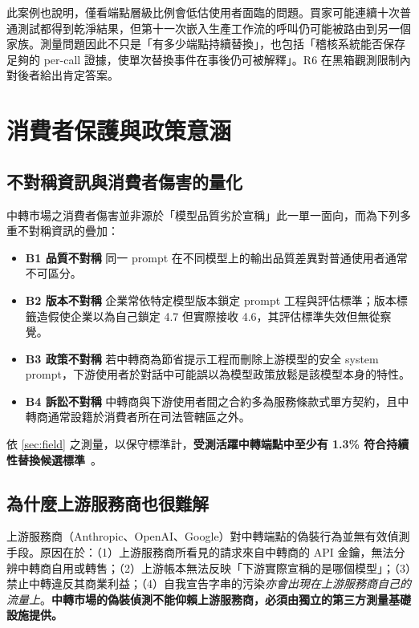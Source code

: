 \documentclass[UTF8,fontset=none,10pt,a4paper,twocolumn]{ctexart}
\begin{document}
此案例也說明，僅看端點層級比例會低估使用者面臨的問題。買家可能連續十次普通測試都得到乾淨結果，但第十一次嵌入生產工作流的呼叫仍可能被路由到另一個家族。測量問題因此不只是「有多少端點持續替換」，也包括「稽核系統能否保存足夠的 per-call 證據，使單次替換事件在事後仍可被解釋」。R6 在黑箱觀測限制內對後者給出肯定答案。

\section{消費者保護與政策意涵}\label{sec:policy}

\subsection{不對稱資訊與消費者傷害的量化}
中轉市場之消費者傷害並非源於「模型品質劣於宣稱」此一單一面向，而為下列多重不對稱資訊的疊加：

\begin{itemize}
\item \textbf{B1 品質不對稱} 同一 prompt 在不同模型上的輸出品質差異對普通使用者通常不可區分。
\item \textbf{B2 版本不對稱} 企業常依特定模型版本鎖定 prompt 工程與評估標準；版本標籤造假使企業以為自己鎖定 4.7 但實際接收 4.6，其評估標準失效但無從察覺。
\item \textbf{B3 政策不對稱} 若中轉商為節省提示工程而刪除上游模型的安全 system prompt，下游使用者於對話中可能誤以為模型政策放鬆是該模型本身的特性。
\item \textbf{B4 訴訟不對稱} 中轉商與下游使用者間之合約多為服務條款式單方契約，且中轉商通常設籍於消費者所在司法管轄區之外。
\end{itemize}

依 \cref{sec:field} 之測量，以保守標準計，\textbf{受測活躍中轉端點中至少有 1.3\% 符合持續性替換候選標準}~\cite{akerlof1970lemons}。

\subsection{為什麼上游服務商也很難解}
上游服務商（Anthropic、OpenAI、Google）對中轉端點的偽裝行為並無有效偵測手段。原因在於：（1）上游服務商所看見的請求來自中轉商的 API 金鑰，無法分辨中轉商自用或轉售；（2）上游帳本無法反映「下游實際宣稱的是哪個模型」；（3）禁止中轉違反其商業利益；（4）自我宣告字串的污染\emph{亦會出現在上游服務商自己的流量上}。\textbf{中轉市場的偽裝偵測不能仰賴上游服務商，必須由獨立的第三方測量基礎設施提供。}
\end{document}
